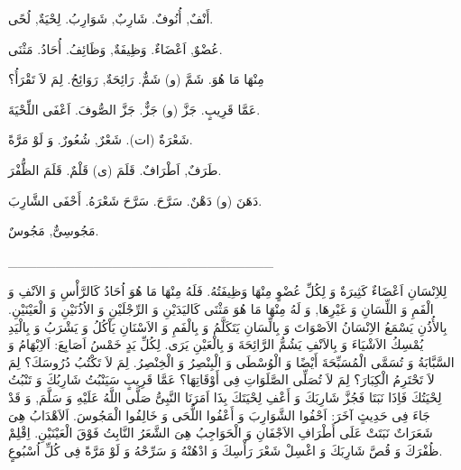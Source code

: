 \documentclass[a5paper]{article}
\begin{document}
أَنْفٌ, أُنُوفٌ. شَارِبٌ, شَوَارِبُ. لِحْيَةٌ, لُحًى.

عُضْوٌ, اَعْضَاءٌ. وَظِيفَةٌ, وَظَائِفُ. أُحَادُ. مَثْنَى. 

مِنْهَا مَا هُوَ. شَمَّ (و) شَمٌّ. رَائِحَةٌ, رَوَائِحُ. لِمَ لاَ تَقْرَأُ؟

عَمَّا قَرِيبٍ. جَزَّ (و) جَزٌّ. جَزَّ الصُّوفَ. اَعْفَى اللِّحْيَةَ.

شَعْرَةٌ (ات). شَعْرٌ, شُعُورٌ. وَ لَوْ مَرَّةً. 

طَرَفٌ, اَطْرَافٌ. قَلَمَ (ى) قَلْمٌ. قَلَمَ الظُّفْرَ. 

دَهَنَ (و) دَهْنٌ. سَرَّحَ. سَرَّحَ شَعْرَهُ. أَحْفَى الشَّارِبَ.

مَجُوسِىٌّ, مَجُوسٌ.

\_\_\_\_\_\_\_\_\_\_\_\_\_\_\_\_\_\_\_\_\_\_\_\_\_\_\_\_

لِلاِنْسَانِ اَعْضَاءٌ كَثِيرَةٌ وَ لِكُلِّ عُضْوٍ مِنْهَا وَظِيفَتُهُ. فَلَهُ مِنْهَا مَا هُوَ اُحَادُ كَالرَّأْسِ وَ الاَنْفِ وَ الْفَمِ وَ اللِّسَانِ وَ غَيْرِهَا, وَ لَهُ مِنْهَا مَا هُوَ مَثْنَى كَاليَدَيْنِ وَ الرِّجْلَيْنِ وَ الاُذُنَيْنِ وَ الْعَيْنَيْنِ. بِالأُذُنِ يَسْمَعُ الاِنْسَانُ الاَصْوَاتَ وَ بِالِّسَانِ يَتَكَلَّمُ وَ بِالْفَمِ وَ الاَسْنَانِ يَاْكُلُ وَ يَشْرَبُ وَ بِالْيَدِ يُمْسِكُ الاَشْيَاءَ وَ بِالاَنْفِ يَشُمُّ الرَّائِحَةَ وَ بِالْعَيْنِ يَرَى. لِكُلِّ يَدٍ خَمْسُ اَصَابِعَ: اَلاِبْهَامُ وَ السَّبَّابَةُ وَ تُسَمَّى الْمُسَبِّحَةَ أَيْضًا وَ الْوُسْطَى وَ الْبِنْصِرُ وَ الْخِنْصِرُ. لِمَ لاَ تَكْتُبُ دُرُوسَكَ؟ لِمَ لاَ تَحْتَرِمُ الْكِبَارَ؟ لِمَ لاَ تُصَلِّى الصَّلَوَاتِ فِى أَوْقَاتِهَا؟ عَمَّا قَرِيبٍ سَيَنْبُتُ شَارِبُكَ وَ تَنْبُتُ لِحْيَتُكَ فَاِذَا نَبَتَا فَجُزَّ شَارِبَكَ وَ أَعْفِ لِحْيَتَكَ بِذَا اَمَرَنَا النَّبِىُّ صَلَّى اللَّهُ عَلَيْهِ وَ سَلَّمَ, وَ قَدْ جَاءَ فِى حَدِيثٍ آخَرَ: اَحْفُوا الشَّوَارِبَ وَ أَعْفُوا اللُّحَى وَ خَالِفُوا الْمَجُوسَ. اَلاَهْدَابُ هِىَ شَعَرَاتٌ نَبَتَتْ عَلَى أَطْرَافِ الاَجْفَانِ وَ الْحَوَاجِبُ هِىَ الشَّعَرُ النَّابِتُ فَوْقَ الْعَيْنَيْنِ. اِقْلِمْ ظُفْرَكَ وَ قُصَّ شَارِبَكَ وَ اغْسِلْ شَعْرَ رَأْسِكَ وَ ادْهُنْهُ وَ سَرِّحْهُ وَ لَوْ مَرَّةً فِى كُلِّ اُسْبُوعٍ.
\end{document}
